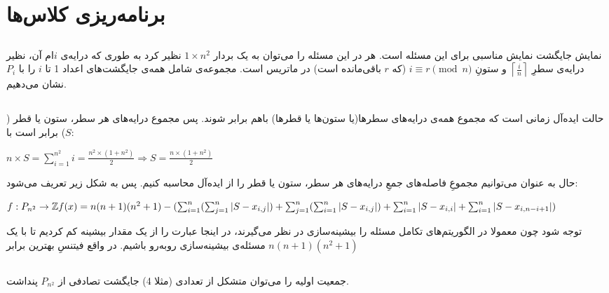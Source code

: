 \documentclass{article}
\begin{document}
\section{برنامه‌ریزی کلاس‌ها}
\subsection{}
نمایش جایگشت نمایش مناسبی برای این مسئله است. هر  در این مسئله را می‌توان به یک بردار
$1 \times n^2$
نظیر کرد به طوری که درایه‌ی $i$ام آن، نظیر درایه‌ی سطرِ
$
\left\lceil \frac{i}{n} \right\rceil
$
و ستونِ
$
i \equiv r \pmod{n} 
$
(که $r$ باقی‌مانده است) در ماتریس  است.
\newline
مجموعه‌ی شامل همه‌ی جایگشت‌های اعداد 1 تا $i$ را با $P_{i}$ نشان می‌دهیم.





\subsection{}
حالت ایده‌آل زمانی است که مجموع همه‌ی درایه‌های سطرها(یا ستون‌ها یا قطرها) باهم برابر شوند. پس مجموع درایه‌های هر سطر، ستون یا قطر ($S$) برابر است با:

\begin{latin}
$
n \times S = \sum_{i = 1}^{n^2}i = \frac{n^2 \times(1 + n^2)}{2}
\Longrightarrow
S = \frac{n \times(1 + n^2)}{2}
$
\end{latin}
حال به عنوان  می‌توانیم مجموعِ فاصله‌های جمعِ درایه‌های هر سطر، ستون یا قطر را از ایده‌آل محاسبه کنیم. پس   به شکل زیر تعریف می‌شود:

\begin{latin}
$
\newline
f: P_{n^2} \to \mathbb{Z}
\newline
f(x) =
n (n+1) (n^2 + 1)-
(   \sum_{i=1}^{n}(\sum_{j=1}^{n} \left| S - x_{i, j} \right|)
+ \sum_{j=1}^{n}(\sum_{i=1}^{n} \left| S - x_{i, j} \right|)
+ \sum_{i=1}^{n}\left| S - x_{i, i} \right|
+ \sum_{i=1}^{n}\left| S - x_{i, n-i+1} \right|)
$
\end{latin}
توجه شود چون معمولا در الگوریتم‌های تکامل مسئله را بیشینه‌سازی در نظر می‌گیرند، در اینجا عبارت را از یک مقدار بیشینه کم کردیم تا با یک مسئله‌ی بیشینه‌سازی رو‌به‌رو باشیم. در واقع فیتنسِ بهترین  برابر
$
n (n+1) (n^2 + 1)
$

\subsection{}
جمعیت اولیه را می‌توان متشکل از تعدادی (مثلا 4) جایگشت تصادفی از $P_{n^2}$ پنداشت.
\end{document}
